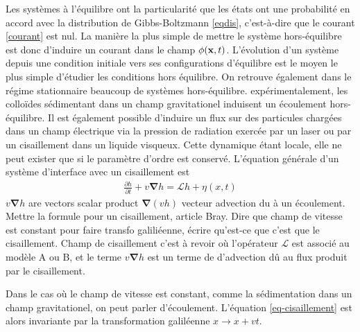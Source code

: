 Les systèmes à l'équilibre ont la particularité que les états ont une probabilité en accord avec la distribution de Gibbs-Boltzmann \ref{eqdis}, c'est-à-dire que le courant \ref{courant} est nul. La manière la plus simple de mettre le système hors-équilibre est donc d'induire un courant dans le champ $\phi({\bf x},t)$. L'évolution d'un système depuis une condition initiale vers ses configurations d'équilibre est le moyen le plus simple d'étudier les conditions hors équilibre. On retrouve également dans le régime stationnaire beaucoup de systèmes hors-équilibre. expérimentalement, les colloïdes sédimentant dans un champ gravitationel induisent un écoulement hors-équilibre. Il est également possible d'induire un flux sur des particules chargées dans un champ électrique via la pression de radiation exercée par un laser ou par un cisaillement dans un liquide visqueux\cite{girot_conical_2019}. Cette dynamique étant locale, elle ne peut exister que si le paramètre d'ordre est conservé. L'équation générale d'un système d'interface avec un cisaillement est\cite{bray_interface_2001-1,bray_interface_2001}
\begin{align}
     \frac{\partial h}{\partial t} + v {\boldsymbol \nabla} h =  \mathcal{L} h +  \eta(x,t)
     \label{eq-cisaillement}
\end{align}
{\color{red} $v {\boldsymbol \nabla} h$ are vectors scalar product ${\boldsymbol \nabla} (vh)$ vecteur advection du à un écoulement. Mettre la formule pour un cisaillement, article Bray. Dire que champ de vitesse est constant pour faire transfo galiliéenne, écrire qu'est-ce que c'est que le cisaillement. 
Champ de cisaillement c'est à revoir}
où l'opérateur $\mathcal{L}$ est associé au modèle A ou B, et le terme $v {\boldsymbol \nabla} h$ est un terme de d'advection dû au flux produit par le cisaillement. 

Dans le cas où le champ de vitesse est constant, comme la sédimentation dans un champ gravitationel, on peut parler d'écoulement. L'équation \ref{eq-cisaillement} est alors invariante par la transformation galiléenne $x \rightarrow x+vt$. 

